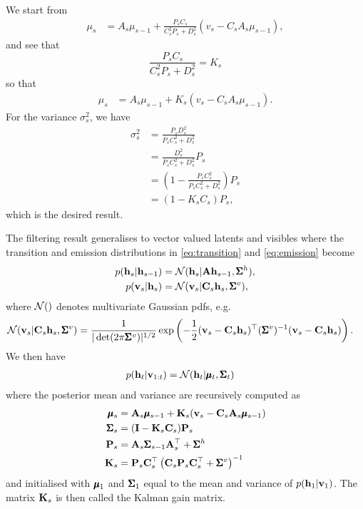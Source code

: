 \begin{exenumerate}
     \begin{solution}
       We start from
       \begin{align}
         \mu_s & = A_s \mu_{s-1} + \frac{P_sC_s}{C_s^2 P_s+ D_s^2}\left(v_s - C_s A_s \mu_{s-1}\right),
       \end{align}
       and see that
       \begin{equation}
         \frac{P_sC_s}{C_s^2 P_s+ D_s^2} = K_s
       \end{equation}
       so that
       \begin{align}
         \mu_s & = A_s \mu_{s-1} + K_s \left(v_s - C_s A_s \mu_{s-1}\right).
       \end{align}
       For the variance $\sigma_s^2$, we have
       \begin{align}
         \sigma^2_s  & =  \frac{P_s D_s^2}{P_s C_s^2+ D_s^2}\\
         & =\frac{D_s^2}{P_s C_s^2+ D_s^2}  P_s \\
         & = \left(1- \frac{P_sC_s^2}{P_s C_s^2+ D_s^2}\right) P_s\\
         & = (1- K_s C_s) P_s,
       \end{align}
       which is the desired result.

       The filtering result generalises to vector valued latents and
       visibles where the transition and emission distributions in
       \eqref{eq:transition} and \eqref{eq:emission} become
       \begin{align}
         p(\mathbf{h}_s | \mathbf{h}_{s-1}) & = \mathcal{N}(\mathbf{h}_s | \mathbf{A} \mathbf{h}_{s-1}, \pmb{\Sigma}^h),\\
         p(\mathbf{v}_s | \mathbf{h}_s) & = \mathcal{N}( \mathbf{v}_s | \mathbf{C}_s \mathbf{h}_s, \pmb{\Sigma}^v),
       \end{align}
       where $\mathcal{N}()$ denotes multivariate Gaussian pdfs, e.g.\
       \begin{align}
         \mathcal{N}(\mathbf{v}_s | \mathbf{C}_s \mathbf{h}_s, \pmb{\Sigma}^v) &= \frac{1}{|\det( 2\pi \pmb{\Sigma}^v)|^{1/2}}\exp\left( -\frac{1}{2} (\mathbf{v}_s-\mathbf{C}_s \mathbf{h}_s)^\top (\pmb{\Sigma}^v)^{-1}(\mathbf{v}_s-\mathbf{C}_s \mathbf{h}_s)\right).
       \end{align}
       We then have
       \begin{align}
         p(\mathbf{h}_t | \mathbf{v}_{1:t}) & = \mathcal{N}( \mathbf{h}_t | \pmb{\mu}_t, \pmb{\Sigma}_t)
       \end{align}
       where the posterior mean and variance are recursively computed as
       \begin{align}
         \pmb{\mu}_s & = \mathbf{A}_s \pmb{\mu}_{s-1} + \mathbf{K}_s ( \mathbf{v}_s-\mathbf{C}_s \mathbf{A}_s \pmb{\mu}_{s-1} )\\
         \pmb{\Sigma}_s & = (\mathbf{I} - \mathbf{K}_s \mathbf{C}_s) \mathbf{P}_s\\
         \mathbf{P}_s & = \mathbf{A}_s \pmb{\Sigma}_{s-1} \mathbf{A}_s^\top + \pmb{\Sigma}^h\\
         \mathbf{K}_s & = \mathbf{P}_s \mathbf{C}_s^\top \left( \mathbf{C}_s \mathbf{P}_s \mathbf{C}_s^\top + \pmb{\Sigma}^v \right)^{-1}
       \end{align}
       and initialised with $\pmb{\mu}_1$ and $\pmb{\Sigma}_1$ equal to the mean
       and variance of $p(\mathbf{h}_1 | \mathbf{v}_1)$. The matrix $\mathbf{K}_s$ is then
       called the Kalman gain matrix.


\end{solution}
\end{exenumerate}
